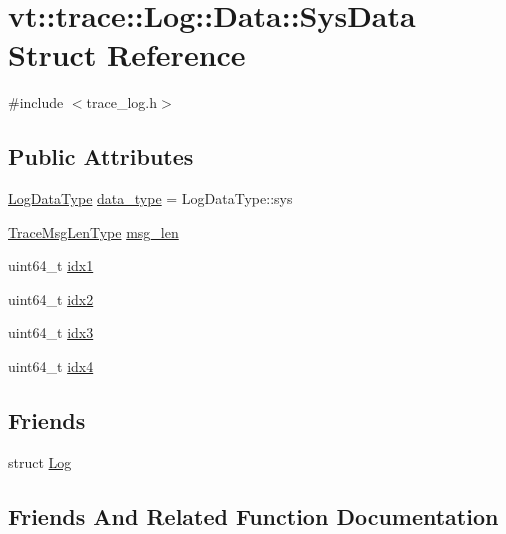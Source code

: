 \hypertarget{structvt_1_1trace_1_1_log_1_1_data_1_1_sys_data}{}\section{vt\+:\+:trace\+:\+:Log\+:\+:Data\+:\+:Sys\+Data Struct Reference}
\label{structvt_1_1trace_1_1_log_1_1_data_1_1_sys_data}


{\ttfamily \#include $<$trace\+\_\+log.\+h$>$}

\subsection*{Public Attributes}
\begin{DoxyCompactItemize}
\item 
\hyperlink{structvt_1_1trace_1_1_log_ae1c08093fd18967b7d4912d04d6acc3d}{Log\+Data\+Type} \hyperlink{structvt_1_1trace_1_1_log_1_1_data_1_1_sys_data_abf36342ab6f92372bf13cf35be7bbb25}{data\+\_\+type} = Log\+Data\+Type\+::sys
\item 
\hyperlink{namespacevt_1_1trace_aeb598f45d67d41db7902e494f2f0ce59}{Trace\+Msg\+Len\+Type} \hyperlink{structvt_1_1trace_1_1_log_1_1_data_1_1_sys_data_a514d2e0977e4acf99920ed45a910ae0a}{msg\+\_\+len}
\item 
uint64\+\_\+t \hyperlink{structvt_1_1trace_1_1_log_1_1_data_1_1_sys_data_a446ec2588d49845c97e4485695943041}{idx1}
\item 
uint64\+\_\+t \hyperlink{structvt_1_1trace_1_1_log_1_1_data_1_1_sys_data_a5df5c2a04facacefdb450e4d228ab8bb}{idx2}
\item 
uint64\+\_\+t \hyperlink{structvt_1_1trace_1_1_log_1_1_data_1_1_sys_data_ab7d9be6fe4d8eb35a832a33f17eaff70}{idx3}
\item 
uint64\+\_\+t \hyperlink{structvt_1_1trace_1_1_log_1_1_data_1_1_sys_data_a7676b739d24eef60c98bf040aa631898}{idx4}
\end{DoxyCompactItemize}
\subsection*{Friends}
\begin{DoxyCompactItemize}
\item 
struct \hyperlink{structvt_1_1trace_1_1_log_1_1_data_1_1_sys_data_add132ae9df1b7ef820c8082c32b0f839}{Log}
\end{DoxyCompactItemize}


\subsection{Friends And Related Function Documentation}
\mbox{\label{structvt_1_1trace_1_1_log_1_1_data_1_1_sys_data_add132ae9df1b7ef820c8082c32b0f839}} 
